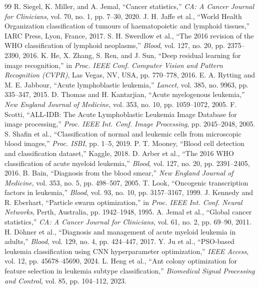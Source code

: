 \documentclass[12pt, a4paper]{article}
\begin{document}
\begin{thebibliography}{99}
R. Siegel, K. Miller, and A. Jemal, ``Cancer statistics,'' \emph{CA: A Cancer Journal for Clinicians}, vol. 70, no. 1, pp. 7--30, 2020.
J. H. Jaffe et al., ``World Health Organization classification of tumours of haematopoietic and lymphoid tissues,'' IARC Press, Lyon, France, 2017.
S. H. Swerdlow et al., ``The 2016 revision of the WHO classification of lymphoid neoplasms,'' \emph{Blood}, vol. 127, no. 20, pp. 2375--2390, 2016.
K. He, X. Zhang, S. Ren, and J. Sun, ``Deep residual learning for image recognition,'' in \emph{Proc. IEEE Conf. Computer Vision and Pattern Recognition (CVPR)}, Las Vegas, NV, USA, pp. 770--778, 2016.
E. A. Rytting and M. E. Jabbour, ``Acute lymphoblastic leukemia,'' \emph{Lancet}, vol. 385, no. 9963, pp. 335--347, 2015.
D. Thomas and H. Kantarjian, ``Acute myelogenous leukemia,'' \emph{New England Journal of Medicine}, vol. 353, no. 10, pp. 1059--1072, 2005.
F. Scotti, ``ALL-IDB: The Acute Lymphoblastic Leukemia Image Database for image processing,'' \emph{Proc. IEEE Int. Conf. Image Processing}, pp. 2045--2048, 2005.
S. Shafin et al., ``Classification of normal and leukemic cells from microscopic blood images,'' \emph{Proc. ISBI}, pp. 1--5, 2019.
P. T. Mooney, ``Blood cell detection and classification dataset,'' Kaggle, 2018.
D. Arber et al., ``The 2016 WHO classification of acute myeloid leukemia,'' \emph{Blood}, vol. 127, no. 20, pp. 2391--2405, 2016.
B. Bain, ``Diagnosis from the blood smear,'' \emph{New England Journal of Medicine}, vol. 353, no. 5, pp. 498--507, 2005.
T. Look, ``Oncogenic transcription factors in leukemia,'' \emph{Blood}, vol. 93, no. 10, pp. 3157--3167, 1999.
J. Kennedy and R. Eberhart, ``Particle swarm optimization,'' in \emph{Proc. IEEE Int. Conf. Neural Networks}, Perth, Australia, pp. 1942--1948, 1995.
A. Jemal et al., ``Global cancer statistics,'' \emph{CA: A Cancer Journal for Clinicians}, vol. 61, no. 2, pp. 69--90, 2011.
H. Döhner et al., ``Diagnosis and management of acute myeloid leukemia in adults,'' \emph{Blood}, vol. 129, no. 4, pp. 424--447, 2017.
Y. Ju et al., ``PSO-based leukemia classification using CNN hyperparameter optimization,'' \emph{IEEE Access}, vol. 12, pp. 45678--45690, 2024.
L. Heng et al., ``Ant colony optimization for feature selection in leukemia subtype classification,'' \emph{Biomedical Signal Processing and Control}, vol. 85, pp. 104--112, 2023.

\end{thebibliography}
\end{document}
